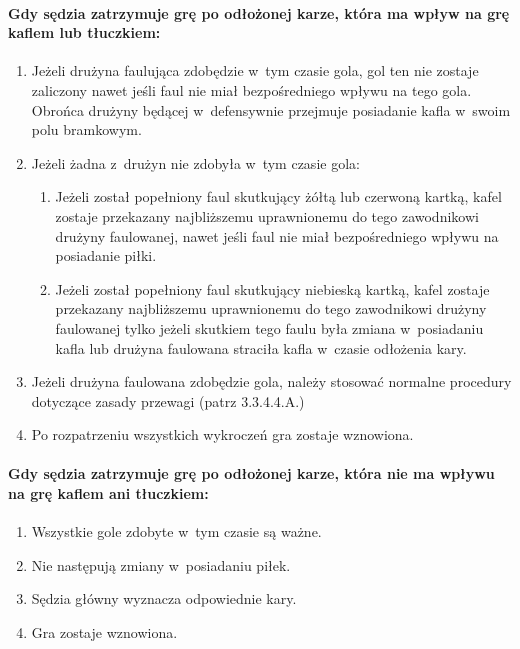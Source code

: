 \documentclass[12pt,a4paper]{article}
\begin{document}
\paragraph{Gdy sędzia zatrzymuje grę po odłożonej karze, która ma
	wpływ na grę kaflem lub tłuczkiem:}

\begin{enumerate}
	\item
	      Jeżeli drużyna faulująca zdobędzie w~tym czasie gola, gol ten nie
	      zostaje zaliczony nawet jeśli faul nie miał bezpośredniego wpływu na
	      tego gola. Obrońca drużyny będącej w~defensywnie przejmuje posiadanie
	      kafla w~swoim polu bramkowym.
	\item
	      Jeżeli żadna z~drużyn nie zdobyła w~tym czasie gola:

	      \begin{enumerate}
		      \item
		            Jeżeli został popełniony faul skutkujący żółtą lub czerwoną kartką,
		            kafel zostaje przekazany najbliższemu uprawnionemu do tego
		            zawodnikowi drużyny faulowanej, nawet jeśli faul nie miał
		            bezpośredniego wpływu na posiadanie piłki.
		      \item
		            Jeżeli został popełniony faul skutkujący niebieską kartką, kafel
		            zostaje przekazany najbliższemu uprawnionemu do tego zawodnikowi
		            drużyny faulowanej tylko jeżeli skutkiem tego faulu była zmiana w~posiadaniu kafla lub drużyna faulowana straciła kafla w~czasie
		            odłożenia kary.
	      \end{enumerate}
	\item
	      Jeżeli drużyna faulowana zdobędzie gola, należy stosować normalne
	      procedury dotyczące zasady przewagi (patrz 3.3.4.4.A.)
	\item
	      Po rozpatrzeniu wszystkich wykroczeń gra zostaje wznowiona.
\end{enumerate}

\paragraph{Gdy sędzia zatrzymuje grę po odłożonej karze, która nie
	ma wpływu na grę kaflem ani tłuczkiem:}

\begin{enumerate}
	\item
	      Wszystkie gole zdobyte w~tym czasie są ważne.
	\item
	      Nie następują zmiany w~posiadaniu piłek.
	\item
	      Sędzia główny wyznacza odpowiednie kary.
	\item
	      Gra zostaje wznowiona.
\end{enumerate}
\end{document}
